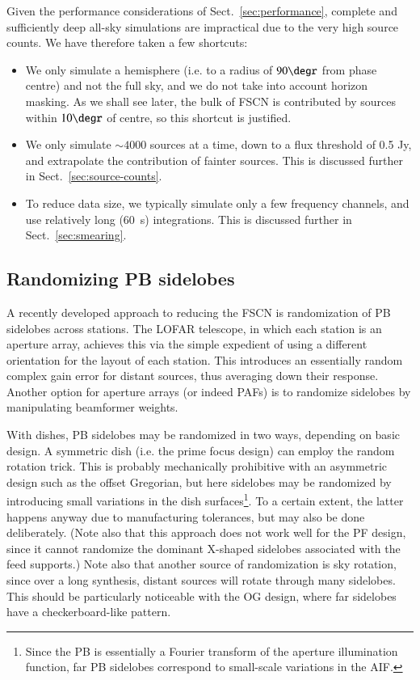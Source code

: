 \documentclass{aa}
\begin{document}
Given the performance considerations of Sect.~\ref{sec:performance}, complete and sufficiently deep all-sky simulations are impractical due to the very high source counts. We have therefore taken a few shortcuts:

\begin{itemize}
  \item We only simulate a hemisphere (i.e. to a radius of $90\degr$ from phase centre) and not the full sky, and we do not take into account horizon masking. As we shall see later, the bulk of FSCN is contributed by sources within $10\degr$ of centre, so this shortcut is justified.
  \item We only simulate $\sim4000$ sources at a time, down to a flux threshold of 0.5 Jy, and extrapolate the contribution of fainter sources. This is discussed further in Sect.~\ref{sec:source-counts}.
  \item To reduce data size, we typically simulate only a few frequency channels, and use relatively long (60~s) integrations. This is discussed further in Sect.~\ref{sec:smearing}.
\end{itemize}

\subsection{Randomizing PB sidelobes}
\label{sec:randomizing}

A recently developed approach to reducing the FSCN is randomization of PB sidelobes across stations. The LOFAR telescope, in which each station is an aperture array, achieves this via the simple expedient of using a different orientation for the layout of each station. This introduces an essentially random complex gain error for distant sources, thus averaging down their response. Another option for aperture arrays (or indeed PAFs) is to randomize sidelobes by manipulating beamformer weights.

With dishes, PB sidelobes may be randomized in two ways, depending on basic design. A symmetric dish (i.e. the prime focus design) can employ the random rotation trick. This is probably mechanically prohibitive with an asymmetric design such as the offset Gregorian, but here sidelobes may be randomized by introducing small variations in the dish surfaces\footnote{Since the PB is essentially a Fourier transform of the aperture illumination function, far PB sidelobes correspond to small-scale variations in the AIF.}. To a certain extent, the latter happens anyway due to manufacturing tolerances, but may also be done deliberately. (Note also that this approach does not work well for the PF design, since it cannot randomize the dominant X-shaped sidelobes associated with the feed supports.) Note also that another source of randomization is sky rotation, since over a long synthesis, distant sources will rotate through many sidelobes. This should be particularly noticeable with the OG design, where far sidelobes 
have a checkerboard-like pattern.
\end{document}
